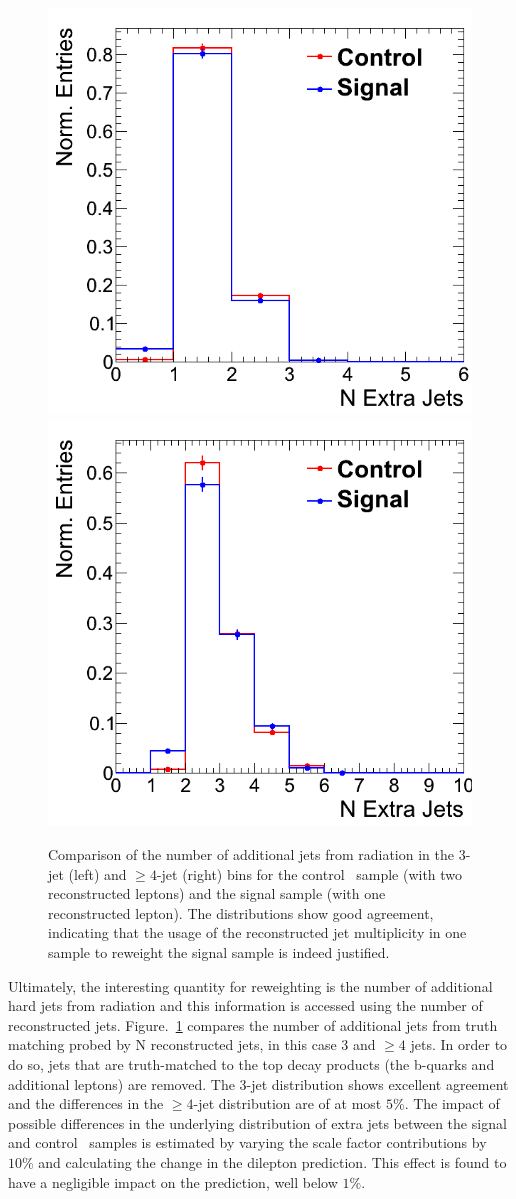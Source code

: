\begin{figure}[hbt]
  \begin{center}
	\includegraphics[width=0.5\linewidth]{plots/ttdl_njets_presel_3j_comp.png}%
	\includegraphics[width=0.5\linewidth]{plots/ttdl_njets_presel_4j_comp.png}
	\caption{
	  \label{fig:dileptonnjets_signalcontrol_comp}%
          Comparison of the number of additional jets from radiation
          in the 3-jet (left) and $\ge4$-jet (right) bins for the control \ttll\
          sample (with two reconstructed leptons) and the signal
          sample (with one reconstructed lepton). The distributions
          show good agreement, indicating that the usage of the
          reconstructed jet multiplicity in one sample to reweight the
        signal sample is indeed justified.}  
      \end{center}
\end{figure}

Ultimately, the interesting quantity for reweighting is the number of
additional hard jets from radiation and this information is accessed using the
number of reconstructed
jets. Figure.~\ref{fig:dileptonnjets_signalcontrol_comp} compares the
number of additional jets from truth matching probed by N
reconstructed jets, in this case 3 and $\ge4$ jets. In order to do so,
jets that are truth-matched to the top decay products (the b-quarks
and additional leptons) are removed. The 3-jet distribution shows 
excellent agreement and the differences in the $\ge4$-jet distribution 
are of at most $5\%$. The impact of possible differences in the
underlying distribution of extra
jets between the signal and control \ttll\ samples is estimated by
varying the scale factor contributions by $10\%$ and calculating the
change in the dilepton prediction. This effect is found to have a
negligible impact on the prediction, well below $1\%$.

